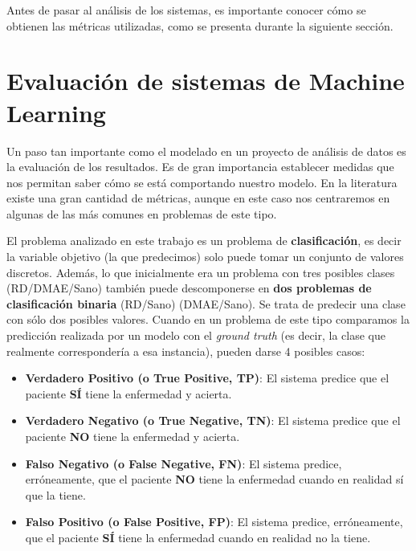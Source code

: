 \documentclass[
  12pt,
  spanish,
  a4paperpaper,
]{report}
\providecommand{\tightlist}{%
  \setlength{\itemsep}{0pt}\setlength{\parskip}{0pt}}
\begin{document}
Antes de pasar al análisis de los sistemas, es importante conocer cómo
se obtienen las métricas utilizadas, como se presenta durante la
siguiente sección.

\hypertarget{evaluaciuxf3n-de-sistemas-de-machine-learning}{%
\section{Evaluación de sistemas de Machine
Learning}\label{evaluaciuxf3n-de-sistemas-de-machine-learning}}

Un paso tan importante como el modelado en un proyecto de análisis de
datos es la evaluación de los resultados. Es de gran importancia
establecer medidas que nos permitan saber cómo se está comportando
nuestro modelo. En la literatura existe una gran cantidad de métricas,
aunque en este caso nos centraremos en algunas de las más comunes en
problemas de este tipo.

El problema analizado en este trabajo es un problema de
\textbf{clasificación}, es decir la variable objetivo (la que
predecimos) solo puede tomar un conjunto de valores discretos. Además,
lo que inicialmente era un problema con tres posibles clases
(RD/DMAE/Sano) también puede descomponerse en \textbf{dos problemas de
clasificación binaria} (RD/Sano) (DMAE/Sano). Se trata de predecir una
clase con sólo dos posibles valores. Cuando en un problema de este tipo
comparamos la predicción realizada por un modelo con el \emph{ground
truth} (es decir, la clase que realmente correspondería a esa
instancia), pueden darse 4 posibles casos:

\begin{itemize}
\tightlist
\item
  \textbf{Verdadero Positivo (o True Positive, TP)}: El sistema predice
  que el paciente \textbf{SÍ} tiene la enfermedad y acierta.
\item
  \textbf{Verdadero Negativo (o True Negative, TN)}: El sistema predice
  que el paciente \textbf{NO} tiene la enfermedad y acierta.
\item
  \textbf{Falso Negativo (o False Negative, FN)}: El sistema predice,
  erróneamente, que el paciente \textbf{NO} tiene la enfermedad cuando
  en realidad sí que la tiene.
\item
  \textbf{Falso Positivo (o False Positive, FP)}: El sistema predice,
  erróneamente, que el paciente \textbf{SÍ} tiene la enfermedad cuando
  en realidad no la tiene.
\end{itemize}
\end{document}
